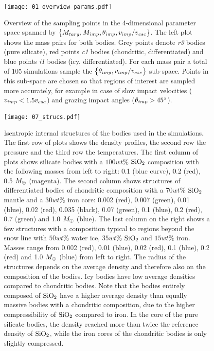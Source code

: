 \begin{figure}[htbp]
\begin{center}
\texttt{[image: 01\_overview\_params.pdf]}
\caption{Overview of the sampling points in the 4-dimensional parameter space spanned by $\big\{ M_{targ}, M_{imp}, \theta_{imp}, v_{imp} / v_{esc} \big\}$. The left plot shows the mass pairs for both bodies. Grey points denote \emph{r3} bodies (pure silicate), red points \emph{c1} bodies (chondritic, differentiated) and blue points \emph{i1} bodies (icy, differentiated). For each mass pair a total of 105 simulations sample the $\big\{ \theta_{imp}, v_{imp} / v_{esc} \big\}$ sub-space. Points in this sub-space are chosen so that regions of interest are sampled more accurately, for example in case of slow impact velocities ($v_{imp} < 1.5 v_{esc}$) and grazing impact angles ($\theta_{imp} > 45 ^\circ$).}
\label{ch03_fig01}
\end{center}
\end{figure}
\begin{figure}[htbp]
\begin{center}
\texttt{[image: 07\_strucs.pdf]}
\caption{Isentropic internal structures of the bodies used in the simulations. The first row of plots shows the density profiles, the second row the pressure and the third row the temperatures. The first column of plots shows silicate bodies with a $100 wt\%$ $\mathrm{SiO}_2$ composition with the following masses from left to right: 0.1 (blue curve), 0.2 (red), 0.5 $M_{\oplus}$ (magenta). The second column shows structures of differentiated bodies of chondritic composition with a $70 wt\%$ $\mathrm{SiO}_2$ mantle and a $30 wt\%$ iron core: 0.002 (red), 0.007 (green), 0.01 (blue), 0.02 (red), 0.035 (black), 0.07 (green), 0.1 (blue), 0.2 (red), 0.7 (green) and 1.0 $M_{\oplus}$ (blue). The last column on the right shows a few structures with a composition typical to regions beyond the snow line with $50 wt\%$ water ice, $35 wt\%$ $\mathrm{SiO}_2$ and $15 wt\%$ iron. Masses range from 0.002 (red), 0.01 (blue), 0.02 (red), 0.1 (blue), 0.2 (red) and 1.0 $M_{\oplus}$ (blue) from left to right. The radius of the structures depends on the average density and therefore also on the composition of the bodies. Icy bodies have low average densities compared to chondritic bodies. Note that the bodies entirely composed of $\mathrm{SiO}_2$ have a higher average density than equally massive bodies with a chondritic composition, due to the higher compressibility of $\mathrm{SiO}_2$ compared to iron. In the core of the pure silicate bodies, the density reached more than twice the reference density of $\mathrm{SiO}_2$, while the iron cores of the chondritic bodies is only slightly compressed.}
\label{ch03_fig07}
\end{center}
\end{figure}

